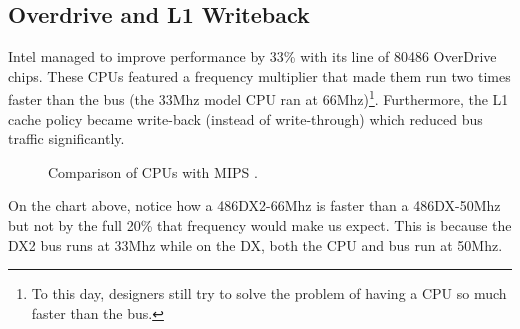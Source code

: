 \subsection{Overdrive and L1 Writeback}
Intel managed to improve performance by 33\% with its line of 80486 OverDrive chips. These CPUs featured a frequency multiplier that made them run two times faster than the bus (the 33Mhz model CPU ran at 66Mhz)\footnote{To this day, designers still try to solve the problem of having a CPU so much faster than the bus.}.  Furthermore, the L1 cache policy became write-back (instead of write-through) which reduced bus traffic significantly.\\
\par 
\vspace{10pt}
\par

\begin{figure}[H]
\centering
   \caption{Comparison of CPUs with MIPS \protect\footnotemark.}
 \end{figure}
\par
On the chart above, notice how a 486DX2-66Mhz is faster than a 486DX-50Mhz but not by the full 20\% that frequency would make us expect. This is because the DX2 bus runs at 33Mhz while on the DX, both the CPU and bus run at 50Mhz.




